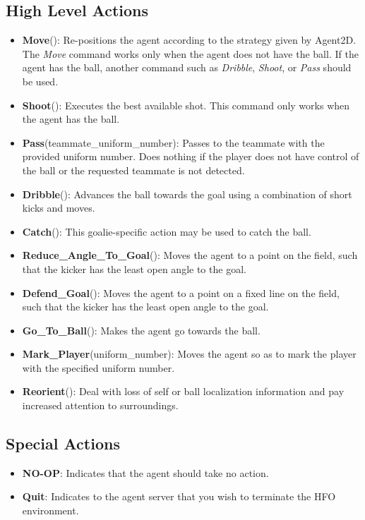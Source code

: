 \documentclass[12pt]{article}
\begin{document}
\subsection{High Level Actions}
\label{sec:high_level_actions}
\begin{itemize}[noitemsep]
\item{\textbf{Move}(): Re-positions the agent according to the
  strategy given by Agent2D. The \textit{Move} command works only when
  the agent does not have the ball. If the agent has the ball, another
  command such as \textit{Dribble}, \textit{Shoot}, or \textit{Pass}
  should be used.}
\item{\textbf{Shoot}(): Executes the best available shot. This command
  only works when the agent has the ball.}
\item{\textbf{Pass}(teammate\_uniform\_number): Passes to the teammate
  with the provided uniform number. Does nothing if the player does
  not have control of the ball or the requested teammate is not
  detected.}
\item{\textbf{Dribble}(): Advances the ball towards the goal using a
  combination of short kicks and moves.}
\item{\textbf{Catch}(): This goalie-specific action may be used to
  catch the ball.}
\item{\textbf{Reduce\_Angle\_To\_Goal}(): Moves the agent to a point on the field,
	such that the kicker has the least open angle to the goal. }
\item{\textbf{Defend\_Goal}(): Moves the agent to a point on a fixed line on the field,
	such that the kicker has the least open angle to the goal.}
\item{\textbf{Go\_To\_Ball}(): Makes the agent go towards the ball.}
\item{\textbf{Mark\_Player}(uniform\_number): Moves the agent so as to mark the player
	with the specified uniform number.}
\item{\textbf{Reorient}(): Deal with loss of self or ball localization information and
	pay increased attention to surroundings.}
\end{itemize}

\subsection{Special Actions}
\begin{itemize}[noitemsep]
\item{\textbf{NO-OP}: Indicates that the agent should take no action.}
\item{\textbf{Quit}: Indicates to the agent server that you wish to
  terminate the HFO environment.}
\end{itemize}
\end{document}
